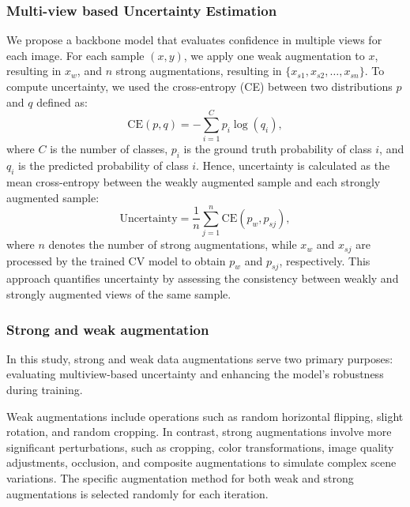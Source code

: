 \documentclass[preprint,12pt,authoryear]{elsarticle}
\begin{document}
\subsubsection{Multi-view based Uncertainty Estimation}
We propose a backbone model that evaluates confidence in multiple views for each image. For each sample \((x, y)\), we apply one weak augmentation to \(x\), resulting in \(x_w\), and \(n\) strong augmentations, resulting in \(\{x_{s1}, x_{s2}, \dots, x_{sn}\}\). To compute uncertainty, we used the cross-entropy (CE) between two distributions \(p\) and \(q\) defined as:
\begin{equation}
\text{CE}(p, q) = -\sum_{i=1}^{C} p_i \log(q_i),
\label{eq:ce}
\end{equation}
where \(C\) is the number of classes, \(p_i\) is the ground truth probability of class \(i\), and \(q_i\) is the predicted probability of class \(i\). Hence, uncertainty is calculated as the mean cross-entropy between the weakly augmented sample and each strongly augmented sample:
\begin{equation}
\text{Uncertainty} = \frac{1}{n} \sum_{j=1}^{n} \text{CE}(p_w, p_{sj}),
\label{eq:uncertainty}
\end{equation}
where $n$ denotes the number of strong augmentations, while $x_w$ and $x_{sj}$ are processed by the trained CV model to obtain $p_w$ and $p_{sj}$, respectively. This approach quantifies uncertainty by assessing the consistency between weakly and strongly augmented views of the same sample.

\subsubsection{Strong and weak augmentation}
In this study, strong and weak data augmentations serve two primary purposes: evaluating multiview-based uncertainty and enhancing the model's robustness during training.

Weak augmentations include operations such as random horizontal flipping, slight rotation, and random cropping. In contrast, strong augmentations involve more significant perturbations, such as cropping, color transformations, image quality adjustments, occlusion, and composite augmentations to simulate complex scene variations. The specific augmentation method for both weak and strong augmentations is selected randomly for each iteration.
\end{document}
